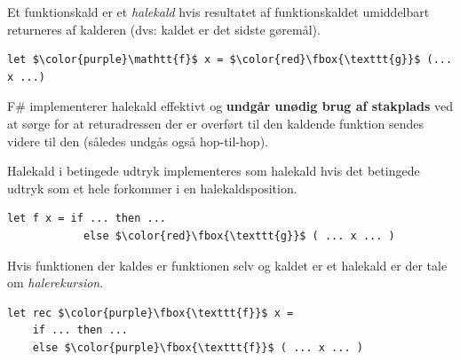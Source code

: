 \documentclass[rgb]{beamer}
\begin{document}
\begin{frame}[fragile]
\begin{footnotesize}

  \vspace{1mm}

  Et funktionskald er et \emph{halekald} hvis resultatet af funktionskaldet umiddelbart returneres af kalderen (dvs: kaldet er det sidste gøremål).
  \vspace{2mm}
\begin{lstlisting}[numbers=none,frame=none,mathescape]
  let $\color{purple}\mathtt{f}$ x = $\color{red}\fbox{\texttt{g}}$ (... x ...)
\end{lstlisting}

  F\# implementerer halekald effektivt og \textbf{undgår unødig brug af
  stakplads} ved at sørge for at returadressen der er overført til {\color{purple}den
  kaldende funktion} sendes videre til den {\color{red}} (således
  undgås også hop-til-hop).
  \vspace{2mm}

  Halekald i betingede udtryk implementeres som halekald hvis det
  betingede udtryk som et hele forkommer i en halekaldsposition.
  \vspace{2mm}
\begin{lstlisting}[numbers=none,frame=none,mathescape]
  let f x = if ... then ...
            else $\color{red}\fbox{\texttt{g}}$ ( ... x ... )
\end{lstlisting}


  \begin{minipage}{.42\textwidth}
  Hvis funktionen der kaldes er funktionen selv og kaldet er et
  halekald er der tale om \emph{halerekursion}.
  \end{minipage}
  \begin{minipage}{.55\textwidth}
\begin{lstlisting}[numbers=none,frame=none,mathescape]
  let rec $\color{purple}\fbox{\texttt{f}}$ x =
    if ... then ...
    else $\color{purple}\fbox{\texttt{f}}$ ( ... x ... )
\end{lstlisting}
  \end{minipage}
\end{footnotesize}
\end{frame}
\end{document}
